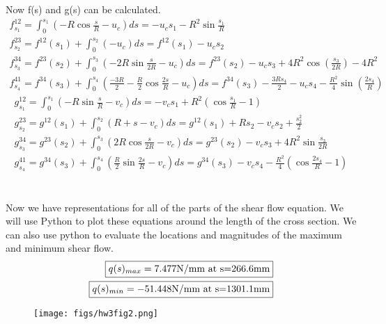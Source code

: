 \documentclass[12 pt]{article}
\begin{document}
Now f(s) and g(s) can be calculated. \\
\begin{align*}
    f^{12}_{s_1}=\int_{0}^{s_1}(-R\cos{\frac{s}{R}}-u_c)ds=-u_cs_1-R^2\sin{\frac{s_1}{R}} \\
    f^{23}_{s_2}=f^{12}(s_1)+\int_{0}^{s_2}(-u_c)ds=f^{12}(s_1)-u_cs_2 \\
    f^{34}_{s_3}=f^{23}(s_2)+\int_{0}^{s_3}\left(-2R\sin{\frac{s}{2R}}-u_c\right)ds=f^{23}(s_2)-u_cs_3+4R^2\cos(\frac{s_3}{2R})-4R^2 \\
    f^{41}_{s_4}=f^{34}(s_3)+\int_{0}^{s_4}\left(\frac{-3R}{2}-\frac{R}{2}\cos{\frac{2s}{R}}-u_c\right)ds=f^{34}(s_3)-\frac{3Rs_4}{2}
    -u_cs_4-\frac{R^2}{4}\sin(\frac{2s_4}{R})
\end{align*}
\begin{align*}
    g^{12}_{s_1}=\int_{0}^{s_1}(-R\sin\frac{s}{R}-v_c)ds=-v_cs_1+R^2(\cos{\frac{s_1}{R}}-1) \\
    g^{23}_{s_2}=g^{12}(s_1)+\int_{0}^{s_2}(R+s-v_c)ds=g^{12}(s_1)+Rs_2-v_cs_2+\frac{s_2^2}{2} \\
    g^{34}_{s_3}=g^{23}(s_2)+\int_{0}^{s_3}(2R\cos{\frac{s}{2R}}-v_c)ds=g^{23}(s_2)-v_cs_3+4R^2\sin\frac{s_3}{2R} \\
    g^{41}_{s_4}=g^{34}(s_3)+\int_{0}^{s_4}(\frac{R}{2}\sin{\frac{2s}{R}}-v_c)ds=g^{34}(s_3)-v_cs_4-\frac{R^2}{4}(\cos{\frac{2s_4}{R}}-1)
\end{align*} \\ \\
Now we have representations for all of the parts of the shear flow equation. We will use Python to plot these equations
around the length of the cross section. We can also use python to evaluate the locations and magnitudes of the maximum
and minimum shear flow. \\
\begin{align*}
    \fbox{$q(s)_{max}=7.477$N/mm at s=266.6mm} \\
    \fbox{$q(s)_{min}=-51.448$N/mm at s=1301.1mm}
\end{align*}
\begin{figure}[H]
    \centering
    \texttt{[image: figs/hw3fig2.png]}
\end{figure}

\pagebreak
\end{document}
